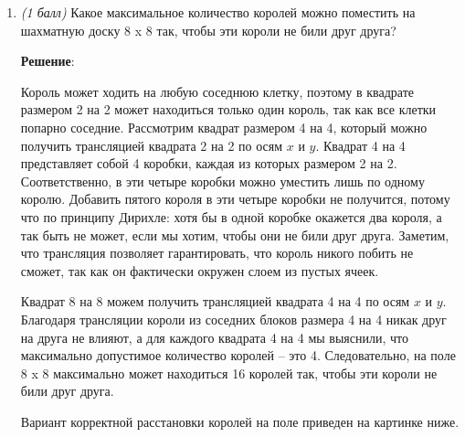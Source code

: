 \documentclass{article}
\begin{document}
    \begin{enumerate}
        \item \textit{(1 балл)} Какое максимальное количество королей можно поместить на шахматную доску 8 x 8 так, чтобы эти короли не били друг друга?
        
        \textbf{Решение}:

        Король может ходить на любую соседнюю клетку, поэтому в квадрате размером 2 на 2 может находиться только один король, так как все клетки попарно соседние. Рассмотрим квадрат размером 4 на 4, который можно получить трансляцией квадрата 2 на 2 по осям $x$ и $y$. Квадрат 4 на 4 представляет собой 4 коробки, каждая из которых размером 2 на 2. Соответственно, в эти четыре коробки можно уместить лишь по одному королю. Добавить пятого короля в эти четыре коробки не получится, потому что по принципу Дирихле: хотя бы в одной коробке окажется два короля, а так быть не может, если мы хотим, чтобы они не били друг друга. Заметим, что трансляция позволяет гарантировать, что король никого побить не сможет, так как он фактически окружен слоем из пустых ячеек.

        Квадрат 8 на 8 можем получить трансляцией квадрата 4 на 4 по осям $x$ и $y$. Благодаря трансляции короли из соседних блоков размера 4 на 4 никак друг на друга не влияют, а для каждого квадрата 4 на 4 мы выяснили, что максимально допустимое количество королей -- это 4. Следовательно, на поле 8 x 8 максимально может находиться 16 королей так, чтобы эти короли не били друг друга.

        Вариант корректной расстановки королей на поле приведен на картинке ниже.


\end{enumerate}
\end{document}
